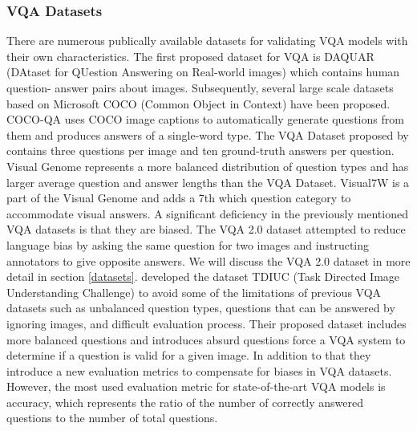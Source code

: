 \documentclass{article}
\begin{document}
\subsubsection{VQA Datasets}

There are numerous publically available datasets for validating VQA models with their own characteristics. The first proposed dataset for VQA is DAQUAR (DAtaset for QUestion Answering on Real-world images) \citep{malinowski2014vqa} which contains human question- answer pairs about images. Subsequently, several large scale datasets based on Microsoft COCO (Common Object in Context) \citep{lin2014microsoft} have been proposed. COCO-QA \cite{ren2015exploring} uses COCO image captions to automatically generate questions from them and produces answers of a single-word type. The VQA Dataset proposed by \cite{antol2015vqa} contains three questions per image and ten ground-truth answers per question. Visual Genome \citep{krishnavisualgenome} represents a more balanced distribution of question types and has larger average question and answer lengths than the VQA Dataset. Visual7W \citep{zhu2016cvpr} is a part of the Visual Genome and adds a 7th which question category to accommodate visual answers. A significant deficiency in the previously mentioned VQA datasets is that they are biased. The VQA 2.0 dataset \citep{goyal2017vqa2} attempted to reduce language bias by asking the same question for two images and instructing annotators to give opposite answers. We will discuss the VQA 2.0 dataset in more detail in section \ref{datasets}. \cite{kafle2017tdiuc} developed the dataset TDIUC (Task Directed Image Understanding Challenge) to avoid some of the limitations of previous VQA datasets such as unbalanced question types, questions that can be answered by ignoring images, and difficult evaluation process. Their proposed dataset includes more balanced questions and introduces absurd questions force a VQA system to determine if a question is valid for a given image. In addition to that they introduce a new evaluation metrics to compensate for biases in VQA datasets. However, the most used evaluation metric for state-of-the-art VQA models is accuracy, which represents the ratio of the number of correctly answered questions to the number of total questions.
\end{document}
